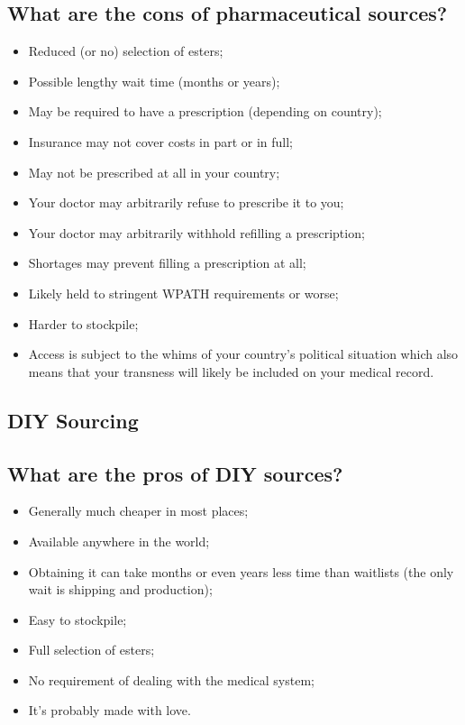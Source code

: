 \documentclass{article}
\begin{document}
\subsection{What are the cons of pharmaceutical sources?}

\begin{itemize}
  \item Reduced (or no) selection of esters;
  \item Possible lengthy wait time (months or years);
  \item May be required to have a prescription (depending on country);
  \item Insurance may not cover costs in part or in full;
  \item May not be prescribed at all in your country;
  \item Your doctor may arbitrarily refuse to prescribe it to you;
  \item Your doctor may arbitrarily withhold refilling a prescription;
  \item Shortages may prevent filling a prescription at all;
  \item Likely held to stringent WPATH requirements or worse;
  \item Harder to stockpile;
  \item Access is subject to the whims of your country’s political situation which also means that your transness will likely be included on your medical record. 
\end{itemize}

\subsection*{DIY Sourcing}

\subsection{What are the pros of DIY sources?}

\begin{itemize}
\item Generally much cheaper in most places;
\item Available anywhere in the world;
\item Obtaining it can take months or even years less time than waitlists (the only wait is shipping and production);
\item Easy to stockpile;
\item Full selection of esters;
\item No requirement of dealing with the medical system;
\item It’s probably made with love.
\end{itemize}
\end{document}

